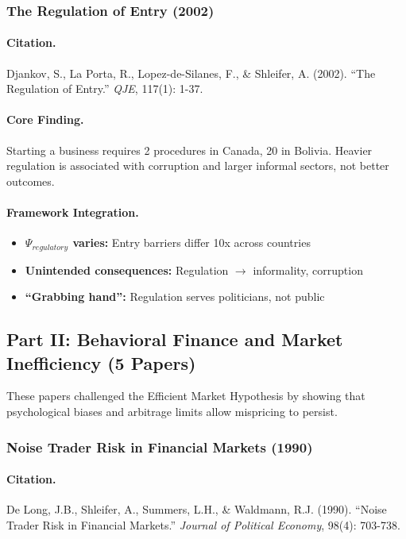 \documentclass[12pt,a4paper]{article}
\begin{document}
\subsubsection{The Regulation of Entry (2002)}

\paragraph{Citation.}
Djankov, S., La Porta, R., Lopez-de-Silanes, F., \& Shleifer, A. (2002).
``The Regulation of Entry.'' \emph{QJE}, 117(1): 1-37.

\paragraph{Core Finding.}
Starting a business requires 2 procedures in Canada, 20 in Bolivia.
Heavier regulation is associated with corruption and larger informal sectors,
not better outcomes.

\paragraph{Framework Integration.}
\begin{itemize}
  \item \textbf{$\Psi_{regulatory}$ varies:} Entry barriers differ 10x across countries
  \item \textbf{Unintended consequences:} Regulation $\to$ informality, corruption
  \item \textbf{``Grabbing hand'':} Regulation serves politicians, not public
\end{itemize}

\subsection{Part II: Behavioral Finance and Market Inefficiency (5 Papers)}

These papers challenged the Efficient Market Hypothesis by showing that
psychological biases and arbitrage limits allow mispricing to persist.

\subsubsection{Noise Trader Risk in Financial Markets (1990)}

\paragraph{Citation.}
De Long, J.B., Shleifer, A., Summers, L.H., \& Waldmann, R.J. (1990).
``Noise Trader Risk in Financial Markets.''
\emph{Journal of Political Economy}, 98(4): 703-738.
\end{document}
